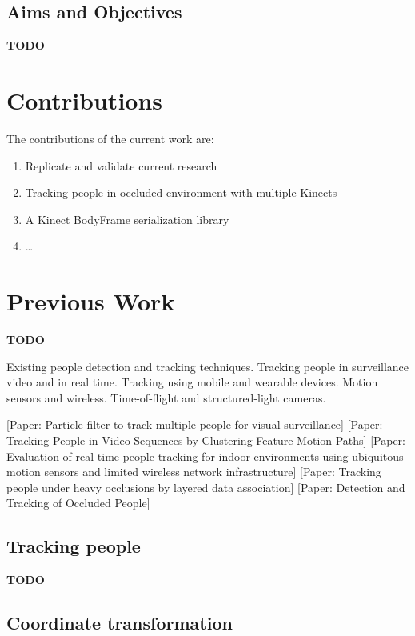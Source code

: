 \documentclass{sigchi}
\begin{document}
\subsection{Aims and Objectives}

\textbf{TODO}

\section{Contributions}
\label{sec:contributions}

The contributions of the current work are:

\begin{enumerate}
  \item Replicate and validate current research
  \item Tracking people in occluded environment with multiple Kinects
  \item A Kinect BodyFrame serialization library
  \item \dots
\end{enumerate}

\section{Previous Work}
\label{sec:previous_work}

\textbf{TODO}

Existing people detection and tracking techniques. Tracking people in surveillance video and in real time. Tracking using mobile and wearable devices. Motion sensors and wireless. Time-of-flight and structured-light cameras.

[Paper: Particle filter to track multiple people for visual surveillance]
[Paper: Tracking People in Video Sequences by Clustering Feature Motion Paths]
[Paper: Evaluation of real time people tracking for indoor environments using ubiquitous motion sensors and limited wireless network infrastructure]
[Paper: Tracking people under heavy occlusions by layered data association]
[Paper: Detection and Tracking of Occluded People]

\subsection{Tracking people}

\textbf{TODO}

\subsection{Coordinate transformation}
\end{document}
